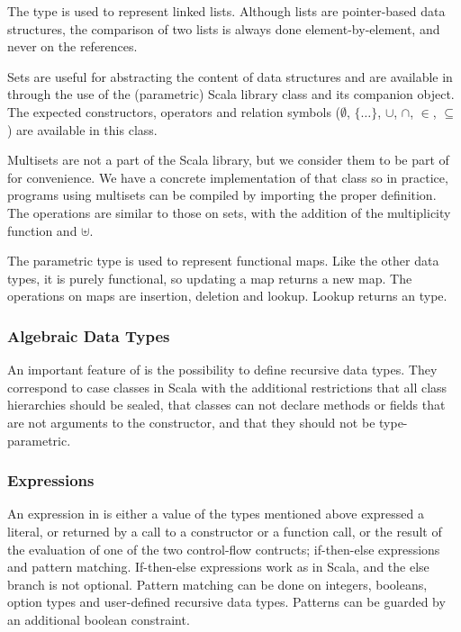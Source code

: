 The  type is used to represent linked lists. Although lists are
pointer-based data structures, the comparison of two lists is always done
element-by-element, and never on the references.

Sets are useful for abstracting the content of data structures and are
available in {\purescala} through the use of the (parametric) Scala library
class  and its companion object. The expected
constructors, operators and relation symbols ($\emptyset$, $\{ \ldots \}$,
$\cup$, $\cap$, $\in$, $\subseteq$) are available in this class.

Multisets are not a part of the Scala library, but we consider them to be part
of {\purescala} for convenience. We have a concrete implementation of that
class so in practice,{\purescala} programs using multisets can be compiled by
importing the proper definition. The operations are similar to those on sets, with the addition of the multiplicity function and $\uplus$.

The parametric type  is used to represent functional maps. Like the
other data types, it is purely functional, so updating a map returns a new map.
The operations on maps are insertion, deletion and lookup. Lookup returns an
 type.

\subsubsection{Algebraic Data Types}
An important feature of {\purescala} is the possibility to define recursive
data types. They correspond to case classes in Scala with the additional
restrictions that all class hierarchies should be sealed, that classes can not
declare methods or fields that are not arguments to the constructor, and that
they should not be type-parametric.

\subsubsection{Expressions}
An expression in {\purescala} is either a value of the types mentioned above
expressed a literal, or returned by a call to a constructor or a function call,
or the result of the evaluation of one of the two control-flow contructs;
if-then-else expressions and pattern matching. If-then-else expressions work as
in Scala, and the else branch is not optional. Pattern matching can be done on
integers, booleans, option types and user-defined recursive data types.
Patterns can be guarded by an additional boolean constraint.

